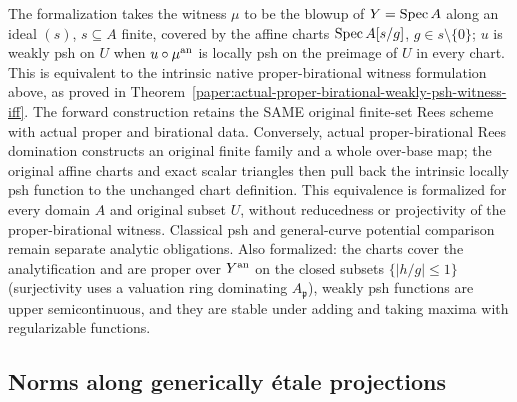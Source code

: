 \begin{remark}\label{rmk:weakly-psh-blowup}
The formalization takes the witness $\mu$ to be the blowup of $Y=\operatorname{Spec} A$ along an ideal $(s)$, $s\subseteq A$
finite, covered by the affine charts $\operatorname{Spec} A[s/g]$, $g\in s\setminus\{0\}$; $u$ is weakly psh on $U$ when
$u\circ\mu^{\mathrm{an}}$ is locally psh on the preimage of $U$ in every chart. This is equivalent to the
intrinsic native proper-birational witness formulation above, as proved in
Theorem~\ref{paper:actual-proper-birational-weakly-psh-witness-iff}. The forward construction retains
the SAME original finite-set Rees scheme with actual proper and birational data. Conversely, actual
proper-birational Rees domination constructs an original finite family and a whole over-base map;
the original affine charts and exact scalar triangles then pull back the intrinsic locally psh
function to the unchanged chart definition. This equivalence is formalized for every domain $A$
and original subset $U$, without reducedness or projectivity of the proper-birational witness.
Classical psh and general-curve potential comparison remain separate analytic obligations.
Also formalized: the charts cover
the analytification and are proper over $Y^{\mathrm{an}}$ on the closed subsets $\{|h/g|\le1\}$ (surjectivity uses
a valuation ring dominating $A_{\mathfrak p}$), weakly psh functions are upper semicontinuous, and they
are stable under adding and taking maxima with regularizable functions.
\end{remark}

\subsection{Norms along generically \'etale projections}\label{subsec:norms}

